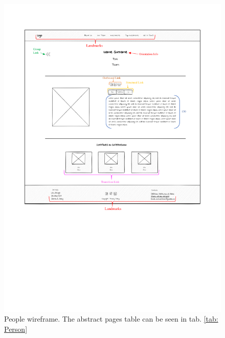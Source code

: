 \begin{figure}
    \centering
    \includegraphics[width=\textwidth]{Images/Wireframes/Person_wireframe.pdf}
    \caption{People wireframe. The abstract pages table can be seen in tab. \ref{tab: Person}}
    \label{fig: PeopleWireframe}
\end{figure}

